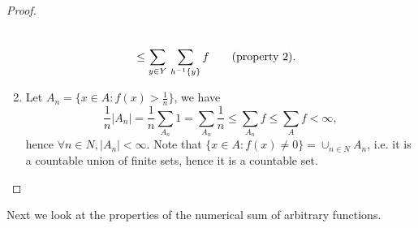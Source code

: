 \begin{proof}
\begin{enumerate}
\begin{align*}
        \notag \\
      &\leq \sum_{y\in Y}\, \sum_{h^{-1}\{y\}} f  \qquad \text{(property 2)}.
        \notag \\
  \end{align*}
\item Let $A_n=\{x\in A:f(x)>\frac{1}{n}\}$, we have
\[
  \frac{1}{n} |A_n| = \frac{1}{n} \sum_{A_n} 1 = \sum_{A_n} \frac{1}{n}
    \leq \sum_{A_n} f \leq \sum_A f <\infty,
\]
hence $\forall n\in N, |A_n|<\infty$.
Note that $\{x\in A:f(x)\neq 0\}=\cup_{n\in N} A_n$, i.e. it is a countable 
union of finite sets, hence it is a countable set.
\end{enumerate}
\end{proof}

Next we look at the properties of the numerical sum of arbitrary functions. 

